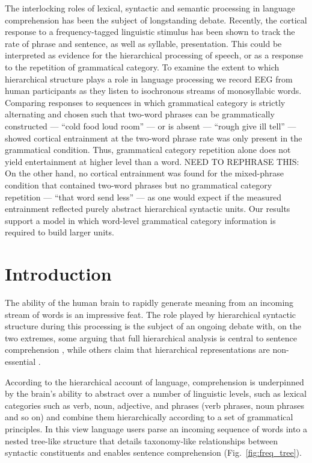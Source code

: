\documentclass[10pt,letterpaper]{article}
\newcommand{\citet}[1]{\cite{#1}}
\begin{document}
The interlocking roles of lexical, syntactic and semantic processing
in language comprehension has been the subject of longstanding
debate. Recently, the cortical response to a frequency-tagged
linguistic stimulus has been shown to track the rate of phrase and
sentence, as well as syllable, presentation. This could be interpreted
as evidence for the hierarchical processing of speech, or as a
response to the repetition of grammatical category. To examine the extent
to which hierarchical structure plays a role in language processing we
record EEG from human participants as they listen to isochronous
streams of monosyllabic words. Comparing responses to sequences in
which grammatical category is strictly alternating and chosen such that
two-word phrases can be grammatically constructed --- ``cold food loud
room'' --- or is absent --- ``rough give ill tell'' --- showed
cortical entrainment at the two-word phrase rate was only present in
the grammatical condition. Thus, grammatical category repetition alone
does not yield entertainment at higher level than a word. NEED TO
REPHRASE THIS: On the other hand, no cortical entrainment was found
for the mixed-phrase condition that contained two-word phrases but no
grammatical category repetition --- ``that word send less'' --- as one
would expect if the measured entrainment reflected purely abstract
hierarchical syntactic units. Our results support a model in which
word-level grammatical category information is required to build larger
units.


\section*{Introduction}

The ability of the human brain to rapidly generate meaning from an
incoming stream of words is an impressive feat. The role played by
hierarchical syntactic structure during this processing is the subject
of an ongoing debate with, on the two extremes, some arguing that full
hierarchical analysis is central to sentence comprehension
\citet{Chomsky1995,BerwickEtAl2013, EveraertEtAl2015}, while others
claim that hierarchical representations are non-essential
\cite{FrankEtAl2012, FrankBod2011, FrankYang2018,
  FrankChristiansen2018}.

According to the hierarchical account of language, comprehension is
underpinned by the brain's ability to abstract over a number of
linguistic levels, such as lexical categories such as verb, noun,
adjective, and phrases (verb phrases, noun phrases and so on) and
combine them hierarchically according to a set of grammatical
principles. In this view language users parse an incoming sequence of
words into a nested tree-like structure that details taxonomy-like
relationships between syntactic constituents and enables sentence
comprehension (Fig.~\ref{fig:freq_tree}).
\end{document}
